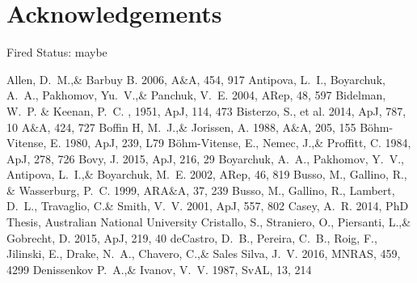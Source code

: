 \documentclass[a4paper,fleqn,usenatbib]{mnras}
\begin{document}
\section*{Acknowledgements}

Fired Status: maybe

 


\begin{thebibliography}{99}
Allen, D.~M.,\& Barbuy B. 2006, 
A$\&$A, 454, 917
Antipova, L.~I., Boyarchuk, A.~A., Pakhomov, Yu.~V.,\& Panchuk, V.~E. 2004, 
ARep, 48, 597
Bidelman, W.~P. \& Keenan, P.~C. , 1951, ApJ, 114, 473
Bisterzo, S., et al. 2014, 
ApJ, 787, 10
A$\&$A, 424, 727
Boffin H, M.~J.,\& Jorissen, A. 1988, 
A$\&$A, 205, 155
B\"ohm-Vitense, E. 1980, 
ApJ, 239, L79
B\"ohm-Vitense, E., Nemec, J.,\& Proffitt, C. 1984, 
ApJ, 278, 726
Bovy, J. 2015, 
ApJ, 216, 29
Boyarchuk, A.~A., Pakhomov, Y.~V., Antipova, L.~I.,\& Boyarchuk, M.~E. 2002, 
ARep, 46, 819
Busso, M., Gallino, R., \& Wasserburg, P.~C. 1999, 
ARA$\&$A, 37, 239
Busso, M., Gallino, R., Lambert, D.~L., Travaglio, C.\& Smith, V.~V. 2001, 
ApJ, 557, 802
Casey, A.~R. 2014, 
PhD Thesis, Australian National University
Cristallo, S., Straniero, O., Piersanti, L.,\& Gobrecht, D. 2015, 
ApJ, 219, 40
deCastro, D.~B., Pereira, C.~B., Roig, F., Jilinski, E., Drake, N.~A., Chavero, C.,\& Sales Silva, J.~V. 2016, 
MNRAS, 459, 4299
Denissenkov P.~A.,\& Ivanov, V.~V. 1987, 
SvAL, 13, 214

\end{thebibliography}
\end{document}

